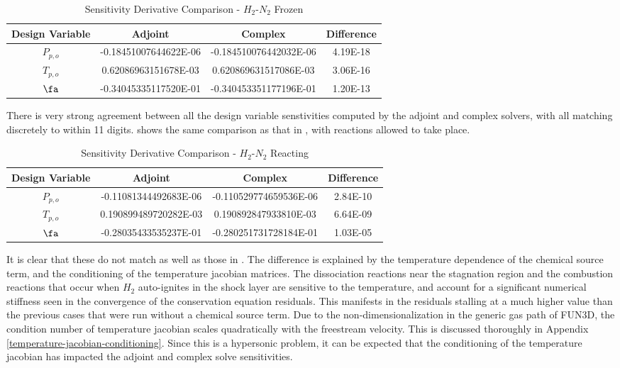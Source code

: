 \begin{table}[h] \centering \begin{tabular}{c|c|c|c} Design Variable & Adjoint &
    Complex & Difference\\ \hline $P_{p,o}$ & -0.18451007644622E-06 &
    -0.184510076442032E-06 & 4.19E-18 \\ $T_{p,o}$ &  0.62086963151678E-03 &
    0.620869631517086E-03 & 3.06E-16 \\ $\fa$     & -0.34045335117520E-01 &
    -0.340453351177196E-01 & 1.20E-13 \end{tabular} \caption{Sensitivity
  Derivative Comparison - $H_2$-$N_2$ Frozen} \label{tab:frozen-deriv-check}
\end{table}
There is very strong agreement between all the design variable senstivities
computed by the adjoint and complex solvers, with all matching discretely to
within 11 digits.   shows the same comparison as
that in , with reactions allowed to take place.
\begin{table}[h] \centering \begin{tabular}{c|c|c|c} Design Variable & Adjoint &
    Complex & Difference\\ \hline $P_{p,o}$ & -0.11081344492683E-06 &
    -0.110529774659536E-06 & 2.84E-10 \\ $T_{p,o}$ & 0.190899489720282E-03 &
    0.190892847933810E-03 & 6.64E-09 \\ $\fa$     & -0.28035433535237E-01 &
    -0.280251731728184E-01 & 1.03E-05 \end{tabular} \caption{Sensitivity
  Derivative Comparison - $H_2$-$N_2$ Reacting} \label{tab:react-deriv-check}
\end{table}
It is clear that these do not match as well as those in
.  The difference is explained
by the temperature dependence of the chemical source term, and the conditioning
of the temperature jacobian matrices.  The dissociation reactions near the
stagnation region and the combustion reactions that occur when $H_2$
auto-ignites in the shock layer are sensitive to the temperature, and account
for a significant numerical stiffness seen in the convergence of the
conservation equation residuals.  This manifests in the residuals stalling at a
much higher value than the previous cases that were run without a chemical
source term.  Due to the non-dimensionalization in the generic gas path of
FUN3D, the condition number of temperature jacobian scales quadratically with
the freestream velocity.  This is discussed thoroughly in Appendix
\ref{temperature-jacobian-conditioning}. Since this is a hypersonic problem,
it can be expected that the conditioning of the temperature jacobian has
impacted the adjoint and complex solve sensitivities.
